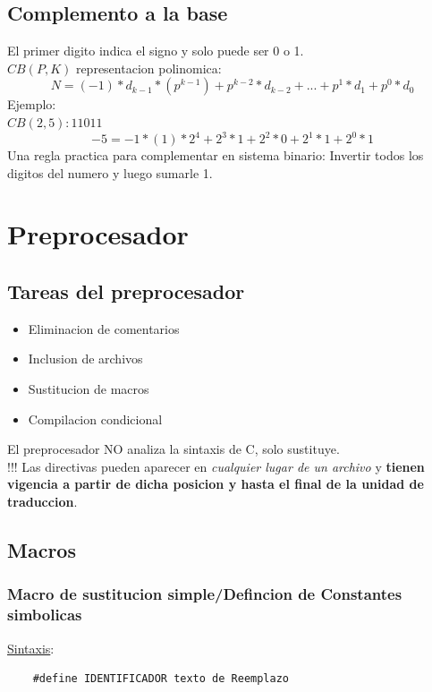 \documentclass{article}
\newcommand{\bld}[1]{\textbf{#1}}
\begin{document}
\subsection{Complemento a la base}
El primer digito indica el signo y solo puede ser 0 o 1.
\\$CB(P,K)$ representacion polinomica:
\begin{equation*}
    N = (-1) * d_{k-1} * (p^{k-1}) + p^{k-2} * d_{k-2} + ... + p^1 * d_1 + p^0 * d_0
\end{equation*}
Ejemplo: 
\\$CB(2,5): 11011$
\begin{equation*}
    -5 = -1 * (1) * 2^4 + 2^3 * 1 + 2^2 * 0 + 2^1 * 1 + 2^0 * 1
\end{equation*}
Una regla practica para complementar en sistema binario: Invertir todos los digitos del numero y luego sumarle 1.

\newpage
\section{Preprocesador}
\subsection{Tareas del preprocesador}
\begin{itemize}
    \item Eliminacion de comentarios
    \item Inclusion de archivos
    \item Sustitucion de macros
    \item Compilacion condicional
\end{itemize}
El preprocesador NO analiza la sintaxis de C, solo sustituye.
\\!!! Las directivas pueden aparecer en \emph{cualquier lugar de un archivo} y \bld{tienen vigencia a partir de dicha posicion y hasta el final de la unidad de traduccion}.

\subsection{Macros}
\subsubsection*{Macro de sustitucion simple/Defincion de Constantes simbolicas}
\underline{Sintaxis}:
\begin{lstlisting}
    #define IDENTIFICADOR texto de Reemplazo
\end{lstlisting}
\end{document}
